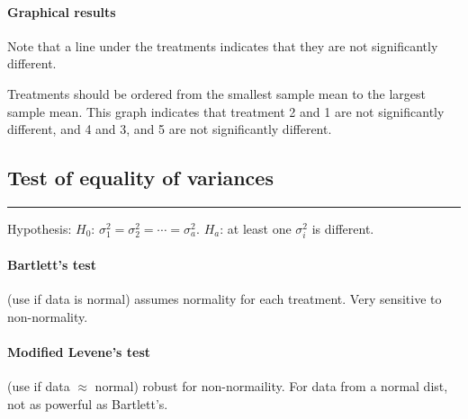 \documentclass[10pt]{article}
\begin{document}
\paragraph{Graphical results} Note that a line under the treatments indicates that they are not significantly different. \\
\begin{multicols}{2}


  
  \noindent Treatments should be ordered from the smallest sample mean to the largest sample mean. This graph indicates that treatment 2 and 1 are not significantly different, and 4 and 3, and 5 are not significantly different.
\end{multicols}

\subsection*{Test of equality of variances}
\hrule width 6cm
\vspace{6pt}
Hypothesis: $H_0$: $\sigma_1^2 = \sigma_2^2 = \cdots = \sigma_a^2$. $H_a$: at least one $\sigma_i^2$ is different.
\paragraph{Bartlett's test} (use if data is normal) assumes normality for each treatment. Very sensitive to non-normality.
\paragraph{Modified Levene's test} (use if data $\approx$ normal) robust for non-normaility. For data from a normal dist, not as powerful as Bartlett's.
\end{document}
